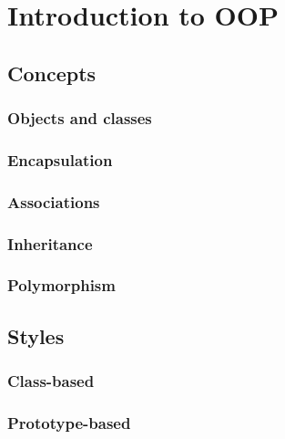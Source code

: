 \documentclass[12pt]{book}
\begin{document}
	\chapter{Introduction to OOP}
\fi



\section{Concepts}

\subsection{Objects and classes}

\subsection{Encapsulation}

\subsection{Associations}

\subsection{Inheritance}

\subsection{Polymorphism}

\section{Styles}

\subsection{Class-based}

\subsection{Prototype-based}

\ifx\wholebook\relax\else
% 
% 
	
\end{document}
